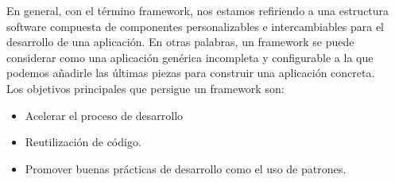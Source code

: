 En  general,  con  el  término  framework, nos estamos refiriendo a una estructura software compuesta de componentes personalizables e intercambiables para el
desarrollo de una aplicación. En otras palabras, un framework se puede considerar como una aplicación genérica incompleta y configurable a la que podemos añadirle las últimas 
piezas para construir una aplicación concreta.\\

Los objetivos principales que persigue un framework son:

\begin{itemize}
 \item Acelerar el proceso de desarrollo
 \item Reutilización de código.
 \item Promover buenas prácticas de desarrollo como el uso de patrones.
\end{itemize}

